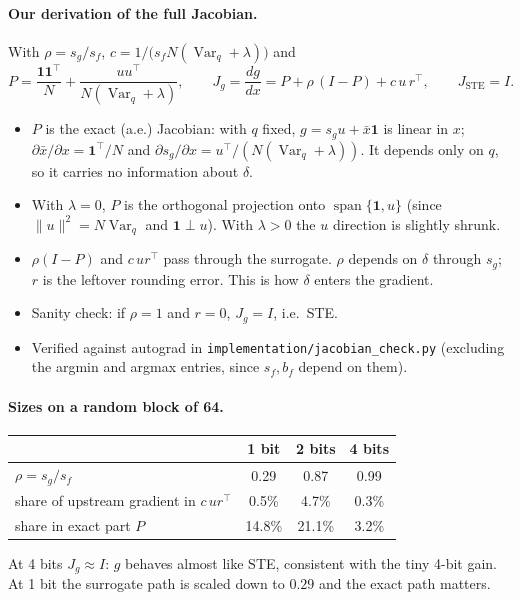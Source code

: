 \documentclass[11pt]{article}
\newcommand{\one}{\mathbf 1}
\newcommand{\Var}{\operatorname{Var}}
\begin{document}
\paragraph{Our derivation of the full Jacobian.} With $\rho=s_g/s_f$, $c=1/\big(s_fN(\Var_q+\lambda)\big)$ and
\[
P=\frac{\one\one^\top}{N}+\frac{uu^\top}{N(\Var_q+\lambda)},
\qquad
\boxed{J_g=\frac{dg}{dx}=P+\rho\,(I-P)+c\,u\,r^\top},\qquad J_{\text{STE}}=I.
\]
\begin{itemize}
\item $P$ is the exact (a.e.) Jacobian: with $q$ fixed, $g=s_gu+\bar x\one$ is linear in $x$; $\partial\bar x/\partial x=\one^\top/N$ and $\partial s_g/\partial x=u^\top/(N(\Var_q+\lambda))$. It depends only on $q$, so it carries no information about $\delta$.
\item With $\lambda=0$, $P$ is the orthogonal projection onto $\operatorname{span}\{\one,u\}$ (since $\|u\|^2=N\Var_q$ and $\one\perp u$). With $\lambda>0$ the $u$ direction is slightly shrunk.
\item $\rho(I-P)$ and $c\,ur^\top$ pass through the surrogate. $\rho$ depends on $\delta$ through $s_g$; $r$ is the leftover rounding error. This is how $\delta$ enters the gradient.
\item Sanity check: if $\rho=1$ and $r=0$, $J_g=I$, i.e.\ STE.
\item Verified against autograd in \texttt{implementation/jacobian\_check.py} (excluding the argmin and argmax entries, since $s_f,b_f$ depend on them).
\end{itemize}

\paragraph{Sizes on a random block of 64.}
\begin{center}
\begin{tabular}{lccc}
\toprule
& 1 bit & 2 bits & 4 bits\\
\midrule
$\rho=s_g/s_f$ & 0.29 & 0.87 & 0.99\\
share of upstream gradient in $c\,ur^\top$ & 0.5\% & 4.7\% & 0.3\%\\
share in exact part $P$ & 14.8\% & 21.1\% & 3.2\%\\
\bottomrule
\end{tabular}
\end{center}
At 4 bits $J_g\approx I$: $g$ behaves almost like STE, consistent with the tiny 4-bit gain. At 1 bit the surrogate path is scaled down to $0.29$ and the exact path matters.
\end{document}
